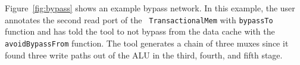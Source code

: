 Figure~\ref{fig:bypass} shows an example bypass network. In this
example, the user annotates the second read port of the {\tt
  TransactionalMem} with {\tt bypassTo} function and has told the tool
to not bypass from the data cache with the {\tt avoidBypassFrom}
function. The tool generates a chain of three muxes since it found three
write paths out of the ALU in the third, fourth, and fifth stage.
